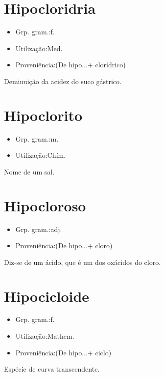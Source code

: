 \documentclass{article}
\begin{document}
\section{Hipocloridria}
\begin{itemize}
\item {Grp. gram.:f.}
\end{itemize}
\begin{itemize}
\item {Utilização:Med.}
\end{itemize}
\begin{itemize}
\item {Proveniência:(De \textunderscore hipo...\textunderscore  + \textunderscore clorídrico\textunderscore )}
\end{itemize}
Deminuição da acidez do suco gástrico.
\section{Hipoclorito}
\begin{itemize}
\item {Grp. gram.:m.}
\end{itemize}
\begin{itemize}
\item {Utilização:Chím.}
\end{itemize}
Nome de um sal.
\section{Hipocloroso}
\begin{itemize}
\item {Grp. gram.:adj.}
\end{itemize}
\begin{itemize}
\item {Proveniência:(De \textunderscore hipo...\textunderscore  + \textunderscore cloro\textunderscore )}
\end{itemize}
Diz-se de um ácido, que é um dos oxácidos do cloro.
\section{Hipocicloide}
\begin{itemize}
\item {Grp. gram.:f.}
\end{itemize}
\begin{itemize}
\item {Utilização:Mathem.}
\end{itemize}
\begin{itemize}
\item {Proveniência:(De \textunderscore hipo...\textunderscore  + \textunderscore ciclo\textunderscore )}
\end{itemize}
Espécie de curva transcendente.
\end{document}
